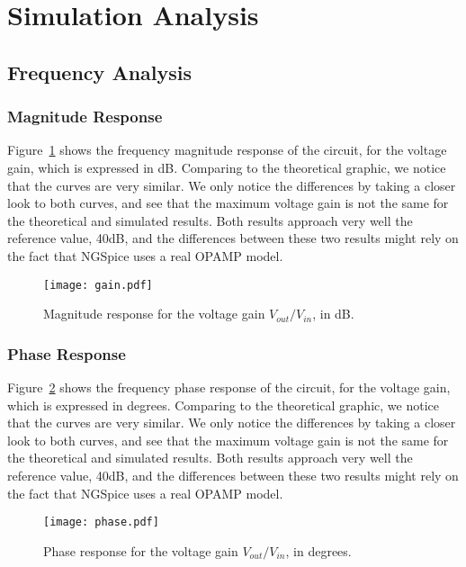\section{Simulation Analysis}
\label{sec:simulation}

\subsection{Frequency Analysis}
\subsubsection{Magnitude Response}

Figure~\ref{fig:gain} shows the frequency magnitude response of the circuit, for the voltage gain, which is expressed in dB. Comparing to the theoretical graphic, we notice that the curves are very similar. We only notice the differences by taking a closer look to both curves, and see that the maximum voltage gain is not the same for the theoretical and simulated results. Both results approach very well the reference value, 40dB, and the differences between these two results might rely on the fact that NGSpice uses a real OPAMP model.

\begin{figure}[H] \centering
\texttt{[image: gain.pdf]}
\caption{Magnitude response for the voltage gain $V_{out}/V_{in}$, in dB.}
\label{fig:gain}
\end{figure}


\subsubsection{Phase Response}


Figure~\ref{fig:phase} shows the frequency phase response of the circuit, for the voltage gain, which is expressed in degrees. Comparing to the theoretical graphic, we notice that the curves are very similar. We only notice the differences by taking a closer look to both curves, and see that the maximum voltage gain is not the same for the theoretical and simulated results. Both results approach very well the reference value, 40dB, and the differences between these two results might rely on the fact that NGSpice uses a real OPAMP model.


\begin{figure}[H] \centering
\texttt{[image: phase.pdf]}
\caption{Phase response for the voltage gain $V_{out}/V_{in}$, in degrees.}
\label{fig:phase}
\end{figure}



